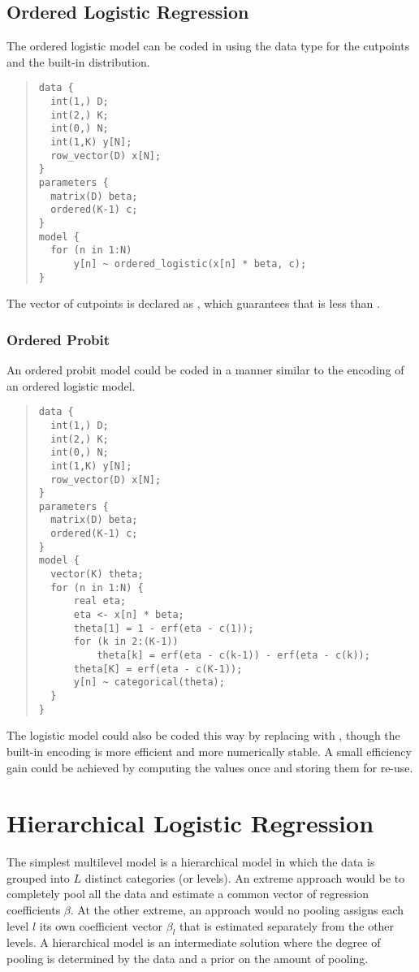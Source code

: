 \subsection{Ordered Logistic Regression}

The ordered logistic model can be coded in \Stan using the
 data type for the cutpoints and the built-in
 distribution.
%
\begin{quote}
\begin{Verbatim} 
data {
  int(1,) D;
  int(2,) K;
  int(0,) N;
  int(1,K) y[N];
  row_vector(D) x[N];
} 
parameters {
  matrix(D) beta;
  ordered(K-1) c;
} 
model {
  for (n in 1:N)
      y[n] ~ ordered_logistic(x[n] * beta, c);
}
\end{Verbatim}
\end{quote}
% 
The vector of cutpoints  is declared as ,
which guarantees that  is less than .

\subsubsection{Ordered Probit}

An ordered probit model could be coded in a manner similar to the
\BUGS encoding of an ordered logistic model.
%
\begin{quote}
\begin{Verbatim}
data {
  int(1,) D;
  int(2,) K;
  int(0,) N;
  int(1,K) y[N];
  row_vector(D) x[N];
}
parameters {
  matrix(D) beta;
  ordered(K-1) c;
}
model {
  vector(K) theta;
  for (n in 1:N) {
      real eta;
      eta <- x[n] * beta;
      theta[1] = 1 - erf(eta - c(1));
      for (k in 2:(K-1))
          theta[k] = erf(eta - c(k-1)) - erf(eta - c(k));
      theta[K] = erf(eta - c(K-1));
      y[n] ~ categorical(theta);
  }
}
\end{Verbatim}
\end{quote}
%
The logistic model could also be coded this way by replacing 
with , though the built-in encoding is more efficient
and more numerically stable.  A small efficiency gain could be
achieved by computing the values  once and
storing them for re-use.

\section{Hierarchical Logistic Regression}

The simplest multilevel model is a hierarchical model in which the
data is grouped into $L$ distinct categories (or levels).  An extreme approach would be to
completely pool all the data and estimate a common vector of
regression coefficients $\beta$.  At the other extreme, an approach
would no pooling assigns each level $l$ its own coefficient vector
$\beta_l$ that is estimated separately from the other levels.  A
hierarchical model is an intermediate solution where the degree of
pooling is determined by the data and a prior on the amount of
pooling.

